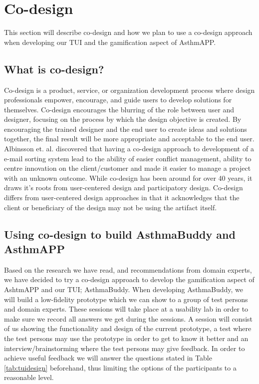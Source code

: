 \section{Co-design}
\label{sec:codesign}
This section will describe co-design and how we plan to use a co-design approach when developing our TUI and the gamification aspect of AsthmAPP.

\subsection{What is co-design?}
Co-design is a product, service, or organization development process where design professionals empower, encourage, and guide users to develop solutions for themselves. Co-design encourages the blurring of the role between user and designer, focusing on the process by which the design objective is created\cite{sanders2008co}. By encouraging the trained designer and the end user to create ideas and solutions together, the final result will be more appropriate and acceptable to the end user\cite{albinsson2007co}. 
Albinsson et. al.\cite{albinsson2007co} discovered that having a co-design approach to development of a e-mail sorting system lead to the ability of easier conflict management, ability to centre innovation on the client/customer and made it easier to manage a project with an unknown outcome. While co-design has been around for over 40 years, it draws it's roots from user-centered design and participatory design. Co-design differs from user-centered design approaches in that it acknowledges that the client or beneficiary of the design may not be using the artifact itself\cite{norman1986user}.



\subsection{Using co-design to build AsthmaBuddy and AsthmAPP}
Based on the research we have read, and recommendations from domain experts, we have decided to try a co-design approach to develop the gamification aspect of AshtmAPP and our TUI; AsthmaBuddy. 
When developing AsthmaBuddy, we will build a low-fidelity prototype which we can show to a group of test persons and domain experts. These sessions will take place at a usability lab in order to make sure we record all answers we get during the sessions. A session will consist of us showing the functionality and design of the current prototype, a test where the test persons may use the prototype in order to get to know it better and an interview/brainstorming where the test persons may give feedback. In order to achieve useful feedback we will answer the questions stated in Table \ref{tab:tuidesign} beforehand, thus limiting the options of the participants to a reasonable level. 

